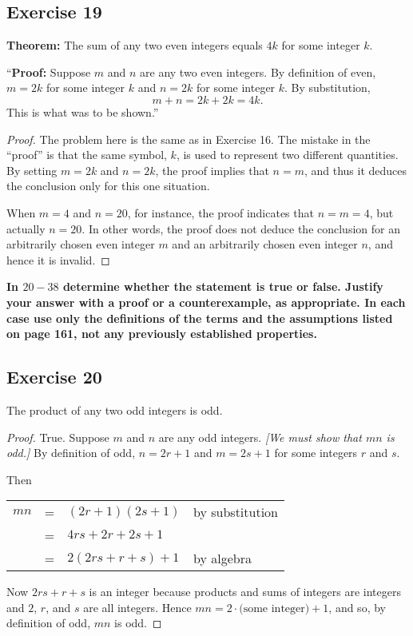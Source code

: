 \documentclass[14pt]{extarticle}
\begin{document}
\subsection{Exercise 19}
{\bf Theorem:} The sum of any two even integers equals $4k$ for some integer $k$.

“{\bf Proof:} Suppose $m$ and $n$ are any two even integers. By definition of even, $m = 2k$ for some integer $k$ and $n = 2k$ for some integer $k$. By substitution, 
$$
m + n = 2k + 2k = 4k.
$$
This is what was to be shown.”

\begin{proof}
The problem here is the same as in Exercise 16. The mistake in the “proof” is that the same symbol, $k$, is used to represent two different quantities. By setting $m = 2k$ and $n = 2k$, the proof implies that $n = m$, and thus it deduces the conclusion only for this one situation. 

When $m = 4$ and $n = 20$, for instance, the proof indicates that $n = m = 4$, but actually $n = 20$. In other words, the proof does not deduce the conclusion for an arbitrarily chosen even integer $m$ and an arbitrarily chosen even integer $n$, and hence it is invalid.
\end{proof}

{\bf \color{cyan} In $20-38$ determine whether the statement is true or false. Justify your answer with a proof or a counterexample, as appropriate. In each case use only the definitions of the terms and the assumptions listed on page 161, not any previously established properties.}

\subsection{Exercise 20}
The product of any two odd integers is odd.

\begin{proof}
True. Suppose $m$ and $n$ are any odd integers. {\it [We must show that $mn$ is odd.]} By definition of odd, $n = 2r + 1$ and $m = 2s + 1$ for some integers $r$ and $s$.

Then

\begin{center}
\begin{tabular}{rcll}
$mn$ & = & $(2r+1)(2s+1)$ & \color{cyan} by substitution \\
& = & $4rs + 2r + 2s + 1$ & \\
& = & $2(2rs + r + s) + 1$ & \color{cyan} by algebra \\
\end{tabular}
\end{center}

Now $2rs + r + s$ is an integer because products and sums
of integers are integers and $2$, $r$, and $s$ are all integers. Hence $mn = 2\cdot \text{(some integer)} + 1$, and so, by definition of odd, $mn$ is odd.
\end{proof}
\end{document}
